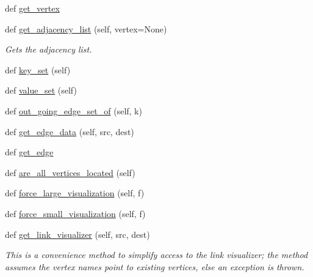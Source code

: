 \begin{DoxyCompactItemize}
def \hyperlink{classbridges_1_1graph__adj__list_1_1_graph_adj_list_a06f04206d9286e8d8d11f50d5fbf6019}{get\+\_\+vertex}
\item 
def \hyperlink{classbridges_1_1graph__adj__list_1_1_graph_adj_list_a523adce952c66505abc5ad14a83ae4c4}{get\+\_\+adjacency\+\_\+list} (self, vertex=None)
\begin{DoxyCompactList}\small\item\em Gets the adjacency list. \end{DoxyCompactList}\item 
def \hyperlink{classbridges_1_1graph__adj__list_1_1_graph_adj_list_a96e264e71acad7474e233a1ec1d1035a}{key\+\_\+set} (self)
\item 
def \hyperlink{classbridges_1_1graph__adj__list_1_1_graph_adj_list_ae12db7b48cf37ba8d2852fa05ebaa2c0}{value\+\_\+set} (self)
\item 
def \hyperlink{classbridges_1_1graph__adj__list_1_1_graph_adj_list_a4ae90f3f2db5f44219fe2a6f9035c9d6}{out\+\_\+going\+\_\+edge\+\_\+set\+\_\+of} (self, k)
\item 
def \hyperlink{classbridges_1_1graph__adj__list_1_1_graph_adj_list_abf7a65867ab342ef0eda4a34b3fe011e}{get\+\_\+edge\+\_\+data} (self, src, dest)
\item 
def \hyperlink{classbridges_1_1graph__adj__list_1_1_graph_adj_list_a2f4c60fcaa52adcb509b3bb8138bc3a1}{get\+\_\+edge}
\item 
def \hyperlink{classbridges_1_1graph__adj__list_1_1_graph_adj_list_a9041f2a5c754141afbc41f02c6a2771c}{are\+\_\+all\+\_\+vertices\+\_\+located} (self)
\item 
def \hyperlink{classbridges_1_1graph__adj__list_1_1_graph_adj_list_aa0eaa5a21f8d8905d02454a83151c20e}{force\+\_\+large\+\_\+visualization} (self, f)
\item 
def \hyperlink{classbridges_1_1graph__adj__list_1_1_graph_adj_list_a036b6368bf916474da748e96dd93ec5a}{force\+\_\+small\+\_\+visualization} (self, f)
\item 
def \hyperlink{classbridges_1_1graph__adj__list_1_1_graph_adj_list_abaa3015ae78e0f5ebc6fd2d2d2772927}{get\+\_\+link\+\_\+visualizer} (self, src, dest)
\begin{DoxyCompactList}\small\item\em This is a convenience method to simplify access to the link visualizer; the method assumes the vertex names point to existing vertices, else an exception is thrown. \end{DoxyCompactList}\item 

\end{DoxyCompactItemize}
